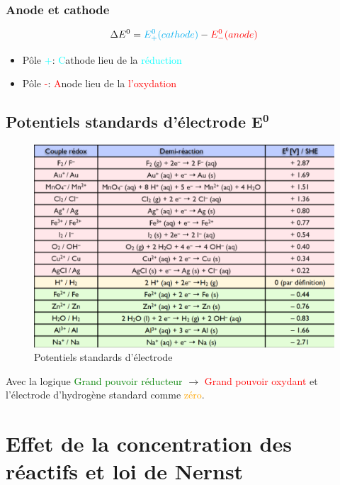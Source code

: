 \documentclass[10pt,a4paper]{book}
\begin{document}
\subsubsection{Anode et cathode}

\[\Delta E^0 = \textcolor{cyan}{E^0_+(cathode)} - \textcolor{red}{E^0_-(anode)}\]
\begin{itemize}
\item Pôle \textcolor{cyan}{+}: \textcolor{cyan}{C}athode lieu de la \textcolor{cyan}{réduction}
\item Pôle \textcolor{red}{-}: \textcolor{red}{A}node lieu de la \textcolor{red}{l'oxydation}
\end{itemize}

\subsection{Potentiels standards d'électrode \texorpdfstring{$\mathbf{E^0}$}{E0}}

\begin{figure}[h!]
\begin{center}
\includegraphics[scale=0.95]{./assets/tab_stand_pots.png}
\end{center}
\caption{Potentiels standards d'électrode}
\label{fig:pot_standard_tab}
\end{figure}
Avec la logique \textcolor{green}{Grand pouvoir réducteur} $\rightarrow$ \textcolor{red}{Grand pouvoir oxydant} et l'électrode d'hydrogène standard comme \textcolor{orange}{zéro}.

\section{Effet de la concentration des réactifs et loi de Nernst}
\end{document}
